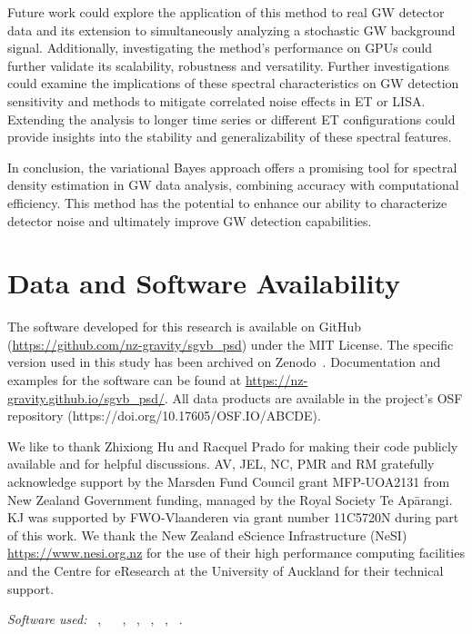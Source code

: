\documentclass[%
 reprint,
 amsmath,amssymb,
 aps,
 nofootinbib,
]{revtex4-2}
\begin{document}
Future work could explore the application of this method to real GW detector data and its extension to simultaneously analyzing a stochastic GW background signal. 
Additionally, investigating the method's performance on GPUs could further validate its scalability, robustness and versatility.
Further investigations could examine the implications of these spectral characteristics on GW detection sensitivity and methods to mitigate correlated noise effects in ET or LISA. Extending the analysis to longer time series or different ET configurations could provide insights into the stability and generalizability of these spectral features.

In conclusion, the variational Bayes approach offers a promising tool for spectral density estimation in GW data analysis, combining accuracy with computational efficiency. This method has the potential to enhance our ability to characterize detector noise and ultimately improve GW detection capabilities.




\section*{Data and Software Availability}
The software developed for this research is available on GitHub (\url{https://github.com/nz-gravity/sgvb_psd}) under the MIT License. 
The specific version used in this study has been archived on Zenodo~\citeme. 
Documentation and examples for the software can be found at \url{https://nz-gravity.github.io/sgvb_psd/}.
All data products are available in the project's OSF repository (https://doi.org/10.17605/OSF.IO/ABCDE)\cite{}.




\begin{acknowledgments}
We like to thank Zhixiong Hu and Racquel Prado for making their code publicly available and for helpful discussions. AV,  JEL, NC, PMR and RM gratefully acknowledge support  by the Marsden Fund Council grant MFP-UOA2131 from New Zealand Government funding, managed by the Royal Society Te Apārangi. KJ was supported by FWO-Vlaanderen via grant number 11C5720N during part of this work.
We thank the New Zealand eScience Infrastructure
(NeSI) \url{https://www.nesi.org.nz} for the use of their high performance computing facilities and the Centre for eResearch at the University of Auckland for their technical
support.
\end{acknowledgments}


\vspace{3mm}

\noindent\textit{Software used:}
\python~\cite{python2020},
\tensorflowProb~\cite{tensorflow, tensorflowProb}
\numpy~\cite{numpy},
\scipy~\cite{scipy},
\pandas~\cite{pandas},
\matplotlib~\cite{matplotlib},
\jupyterbook~\cite{jupyterbook}.




\end{document}
